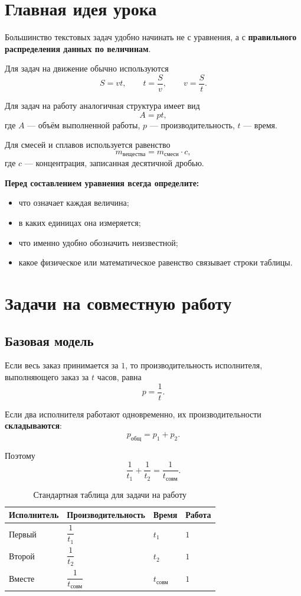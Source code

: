 \documentclass[a4paper,12pt]{article}
\newcommand{\key}[1]{\textcolor{darkaccent}{\textbf{#1}}}
\begin{document}
\section*{Главная идея урока}

Большинство текстовых задач удобно начинать не с уравнения, а с
\key{правильного распределения данных по величинам}.

Для задач на движение обычно используются
\[
S=vt,
\qquad
t=\frac{S}{v},
\qquad
v=\frac{S}{t}.
\]

Для задач на работу аналогичная структура имеет вид
\[
A=pt,
\]
где \(A\) --- объём выполненной работы,
\(p\) --- производительность,
\(t\) --- время.

Для смесей и сплавов используется равенство
\[
m_{\text{вещества}}
=
m_{\text{смеси}}\cdot c,
\]
где \(c\) --- концентрация, записанная десятичной дробью.

\key{Перед составлением уравнения всегда определите:}
\begin{itemize}
    \item что означает каждая величина;
    \item в каких единицах она измеряется;
    \item что именно удобно обозначить неизвестной;
    \item какое физическое или математическое равенство связывает строки таблицы.
\end{itemize}


\section{Задачи на совместную работу}

\subsection*{Базовая модель}

Если весь заказ принимается за \(1\), то производительность исполнителя,
выполняющего заказ за \(t\) часов, равна
\[
p=\frac{1}{t}.
\]

Если два исполнителя работают одновременно, их производительности
\key{складываются}:
\[
p_{\text{общ}}=p_1+p_2.
\]

Поэтому
\[
\frac1{t_1}+\frac1{t_2}
=
\frac1{t_{\text{совм}}}.
\]

\begin{table}[ht]
\centering
\caption{Стандартная таблица для задачи на работу}
\renewcommand{\arraystretch}{1.35}
\begin{tabularx}{\linewidth}{Y Y Y Y}
\toprule
Исполнитель &
Производительность &
Время &
Работа \\
\midrule
Первый &
\(\dfrac1{t_1}\) &
\(t_1\) &
\(1\) \\
Второй &
\(\dfrac1{t_2}\) &
\(t_2\) &
\(1\) \\
Вместе &
\(\dfrac1{t_{\text{совм}}}\) &
\(t_{\text{совм}}\) &
\(1\) \\
\bottomrule
\end{tabularx}
\end{table}
\end{document}
